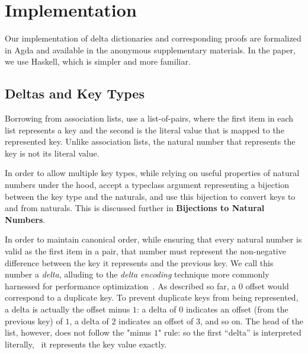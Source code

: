 \section{Implementation}
\label{sec:DD}



Our implementation of delta dictionaries and corresponding proofs are formalized in Agda and available in the anonymous supplementary materials.
%
In the paper, we use Haskell, which is simpler and more familiar.

\subsection{Deltas and Key Types}

Borrowing from association lists, \dds{} use a list-of-pairs, where the first item in each list represents a key and the second is the literal value that is mapped to the represented key.
%
Unlike association lists, the natural number that represents the key is not its literal value.

In order to allow multiple key types, while relying on useful properties of natural numbers under the hood, \dds{} accept a typeclass argument representing a bijection
%
between the key type and the naturals, and use this bijection to convert keys to and from naturals. This is discussed further in \textbf{Bijections to Natural Numbers}.

In order to maintain canonical order, while ensuring that every natural number is valid as the first item in a pair, that number must represent the non-negative difference between the key it represents and the previous key.
%
We call this number a \emph{delta}, alluding to the \emph{delta encoding} technique more commonly harnessed for performance optimization~\citep{XXX}.
%
As described so far, a $0$ offset would correspond to a duplicate key.
%
To prevent duplicate keys from being represented, a delta is actually the offset minus $1$: a delta of $0$ indicates an offset (from the previous key) of $1$, a delta of $2$ indicates an offset of $3$, and so on.
%
The head of the list, however, does not follow the "minus $1$" rule: so the first ``delta'' is interpreted literally, \ie{}~it represents the key value exactly.

